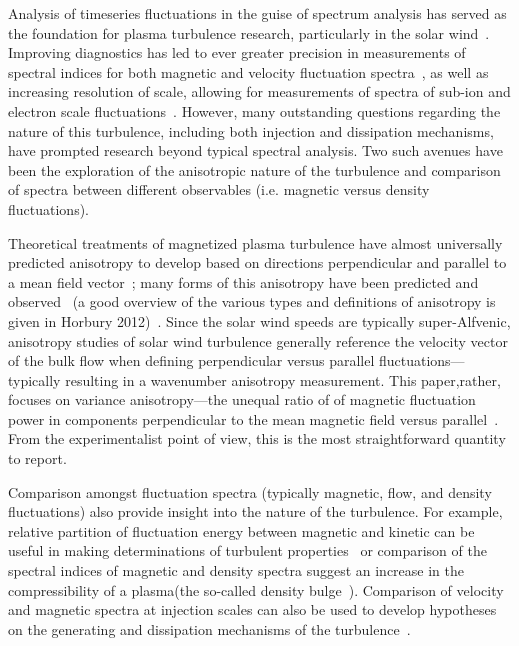 \documentclass[aip,prl,amsmath,amssymb,reprint,superscriptaddress]{revtex4-1} %
\begin{document}
Analysis of timeseries fluctuations in the guise of spectrum analysis has served as the foundation for plasma turbulence research, particularly in the solar wind~\cite{goldstein95,tumarsch95}. Improving diagnostics has led to ever greater precision in measurements of spectral indices for both magnetic and velocity fluctuation spectra~\cite{podesta07}, as well as increasing resolution of scale, allowing for measurements of spectra of sub-ion and electron scale fluctuations~\cite{yordanova08,alexandrova09,sahraoui09,chen13}. However, many outstanding questions regarding the nature of this turbulence, including both injection and dissipation mechanisms, have prompted research beyond typical spectral analysis. Two such avenues have been the exploration of the anisotropic nature of the turbulence and comparison of spectra between different observables (i.e. magnetic versus density fluctuations).

Theoretical treatments of magnetized plasma turbulence have almost universally predicted anisotropy to develop based on directions perpendicular and parallel to a mean field vector~\cite{montgomery81,matthaeus90,goldreich95,zhou04,boldyrev06}; many forms of this anisotropy have been predicted and observed~\cite{dasso05,horbury08,podesta09,perri09,wicks10,he11} (a good overview of the various types and definitions of anisotropy is given in Horbury 2012)~\cite{horbury12}. Since the solar wind speeds are typically super-Alfvenic, anisotropy studies of solar wind turbulence generally reference the velocity vector of the bulk flow when defining perpendicular versus parallel fluctuations---typically resulting in a wavenumber anisotropy measurement. This paper,rather, focuses on variance anisotropy---the unequal ratio of of magnetic fluctuation power in components perpendicular to the mean magnetic field versus parallel~\cite{belcher71,smith06}. From the experimentalist point of view, this is the most straightforward quantity to report.

Comparison amongst fluctuation spectra (typically magnetic, flow, and density fluctuations) also provide insight into the nature of the turbulence. For example, relative partition of fluctuation energy between magnetic and kinetic can be useful in making determinations of turbulent properties~\cite{podesta07} or comparison of the spectral indices of magnetic and density spectra suggest an increase in the compressibility of a plasma(the so-called density bulge~\cite{coles89,harmon05}). Comparison of velocity and magnetic spectra at injection scales can also be used to develop hypotheses on the generating and dissipation mechanisms of the turbulence~\cite{roberts10}.
\end{document}
